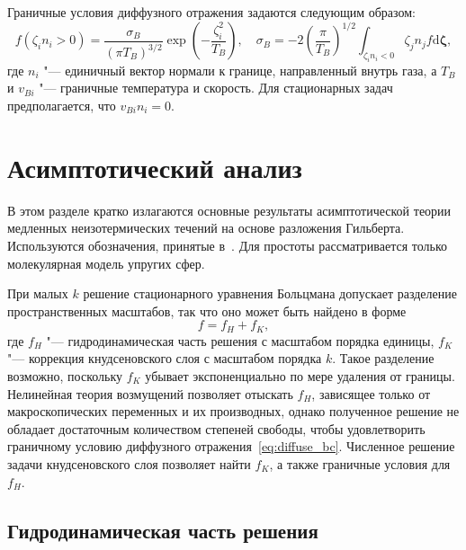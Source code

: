\documentclass[
aps,%
12pt,%
final,%
notitlepage,%
oneside,%
onecolumn,%
nobibnotes,%
nofootinbib,%
superscriptaddress,%
noshowpacs,%
showkeys,%
floatfix,%
tightenlines,%
centertags]%
{revtex4}
\newcommand{\dd}{\mathrm{d}}
\newcommand{\dzeta}{\boldsymbol{\dd\zeta}}
\begin{document}
Граничные условия диффузного отражения задаются следующим образом:
\begin{equation}\label{eq:diffuse_bc}
    f\left(\zeta_i n_i > 0\right) =
        \frac{\sigma_B}{(\pi T_B)^{3/2}} \exp\left(-\frac{\zeta_i^2}{T_B}\right), \quad
    \sigma_B = -2\left(\frac{\pi}{T_B}\right)^{1/2} \int_{\zeta_i n_i < 0} \zeta_j n_j f\dzeta,
\end{equation}
где \(n_i\) "--- единичный вектор нормали к границе, направленный внутрь газа,
а \(T_B\) и \(v_{Bi}\) "--- граничные температура и скорость.
Для стационарных задач предполагается, что \(v_{Bi}n_i = 0\).

\section{Асимптотический анализ}

В этом разделе кратко излагаются основные результаты асимптотической теории
медленных неизотермических течений на основе разложения Гильберта.
Используются обозначения, принятые в~\cite{Sone2002, Sone2007}.
Для простоты рассматривается только молекулярная модель упругих сфер.

При малых \(k\) решение стационарного уравнения Больцмана допускает разделение пространственных масштабов,
так что оно может быть найдено в форме
\begin{equation}\label{eq:sum_solutions}
    f = f_H + f_K,
\end{equation}
где \(f_H\) "--- гидродинамическая часть решения с масштабом порядка единицы,
\(f_K\) "--- коррекция кнудсеновского слоя с масштабом порядка \(k\).
Такое разделение возможно, поскольку \(f_K\) убывает экспоненциально по мере удаления от границы.
Нелинейная теория возмущений позволяет отыскать \(f_H\),
зависящее только от макроскопических переменных и их производных,
однако полученное решение не обладает достаточным количеством степеней свободы,
чтобы удовлетворить граничному условию диффузного отражения~\eqref{eq:diffuse_bc}.
Численное решение задачи кнудсеновского слоя позволяет найти \(f_K\),
а также граничные условия для \(f_H\).

\subsection{Гидродинамическая часть решения}
\end{document}
